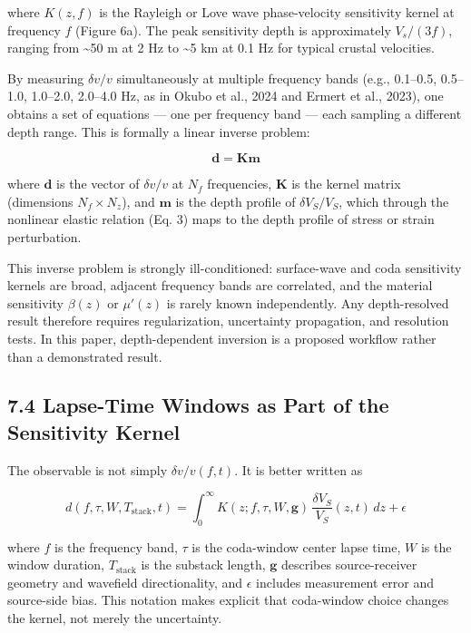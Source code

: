 \documentclass[12pt]{article}
\begin{document}
where \(K(z, f)\) is the Rayleigh or Love wave phase-velocity
sensitivity kernel at frequency \(f\) (Figure 6a). The peak sensitivity
depth is approximately \(V_s / (3f)\), ranging from \textasciitilde{}50
m at 2 Hz to \textasciitilde{}5 km at 0.1 Hz for typical crustal
velocities.

By measuring \(\delta v/v\) simultaneously at multiple frequency bands
(e.g., 0.1--0.5, 0.5--1.0, 1.0--2.0, 2.0--4.0 Hz, as in Okubo et al.,
2024 and Ermert et al., 2023), one obtains a set of equations --- one
per frequency band --- each sampling a different depth range. This is
formally a linear inverse problem:

\[\mathbf{d} = \mathbf{K} \mathbf{m} \tag{14}\]

where \(\mathbf{d}\) is the vector of \(\delta v/v\) at \(N_f\)
frequencies, \(\mathbf{K}\) is the kernel matrix (dimensions
\(N_f \times N_z\)), and \(\mathbf{m}\) is the depth profile of
\(\delta V_S / V_S\), which through the nonlinear elastic relation (Eq.
3) maps to the depth profile of stress or strain perturbation.

This inverse problem is strongly ill-conditioned: surface-wave and coda
sensitivity kernels are broad, adjacent frequency bands are correlated,
and the material sensitivity \(\beta(z)\) or \(\mu'(z)\) is rarely known
independently. Any depth-resolved result therefore requires
regularization, uncertainty propagation, and resolution tests. In this
paper, depth-dependent inversion is a proposed workflow rather than a
demonstrated result.

\subsection{7.4 Lapse-Time Windows as Part of the Sensitivity
Kernel}\label{lapse-time-windows-as-part-of-the-sensitivity-kernel}

The observable is not simply \(\delta v/v(f,t)\). It is better written
as

\[d(f,\tau,W,T_{\mathrm{stack}},t) = \int_0^\infty K(z; f,\tau,W,\mathbf{g}) \, \frac{\delta V_S}{V_S}(z,t) \, dz + \epsilon \tag{15}\]

where \(f\) is the frequency band, \(\tau\) is the coda-window center
lapse time, \(W\) is the window duration, \(T_{\mathrm{stack}}\) is the
substack length, \(\mathbf{g}\) describes source-receiver geometry and
wavefield directionality, and \(\epsilon\) includes measurement error
and source-side bias. This notation makes explicit that coda-window
choice changes the kernel, not merely the uncertainty.
\end{document}
